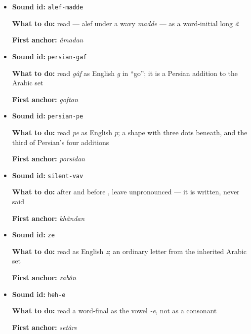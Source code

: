 \begin{itemize}
\begin{minipage}[t]{\linewidth}
  \par \textbf{What to do:} recognize \textbf{} at the left end of a right-to-left question
  \par \textbf{First anchor:} \textbf{  }
  \end{minipage}
  \item \begin{minipage}[t]{\linewidth}
  \textbf{Sound id:} \texttt{alef-madde}
  \par \textbf{What to do:} read \textbf{} — alef under a wavy \emph{madde} — as a word-initial long \emph{â}
  \par \textbf{First anchor:} \textbf{} \emph{âmadan}
  \end{minipage}
  \item \begin{minipage}[t]{\linewidth}
  \textbf{Sound id:} \texttt{persian-gaf}
  \par \textbf{What to do:} read \textbf{} \emph{gâf} as English \emph{g} in “go”; it is a Persian addition to the Arabic set
  \par \textbf{First anchor:} \textbf{} \emph{goftan}
  \end{minipage}
  \item \begin{minipage}[t]{\linewidth}
  \textbf{Sound id:} \texttt{persian-pe}
  \par \textbf{What to do:} read \textbf{} \emph{pe} as English \emph{p}; a \textbf{} shape with three dots beneath, and the third of Persian's four additions
  \par \textbf{First anchor:} \textbf{} \emph{porsidan}
  \end{minipage}
  \item \begin{minipage}[t]{\linewidth}
  \textbf{Sound id:} \texttt{silent-vav}
  \par \textbf{What to do:} after \textbf{} and before \textbf{}, leave \textbf{} unpronounced — it is written, never said
  \par \textbf{First anchor:} \textbf{} \emph{khândan}
  \end{minipage}
  \item \begin{minipage}[t]{\linewidth}
  \textbf{Sound id:} \texttt{ze}
  \par \textbf{What to do:} read \textbf{} as English \emph{z}; an ordinary letter from the inherited Arabic set
  \par \textbf{First anchor:} \textbf{} \emph{zabân}
  \end{minipage}
  \item \begin{minipage}[t]{\linewidth}
  \textbf{Sound id:} \texttt{heh-e}
  \par \textbf{What to do:} read a word-final \textbf{} as the vowel \emph{-e}, not as a consonant
  \par \textbf{First anchor:} \textbf{} \emph{setâre}
  \end{minipage}
\end{itemize}

